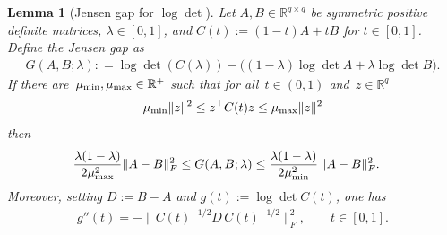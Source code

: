 \documentclass[10pt, letterpaper]{amsart}
\def\bR{\mathbb{R}}
\newtheorem{lem}[theorem]{Lemma}
\def\min{{\rm min}}
\begin{document}
\begin{lem}[Jensen gap for $\log\det$]\label{lem:jensen_gap_logdet}
Let $A,B\in\bR^{q\times q}$ be symmetric positive definite matrices, $\lambda \in [0,1]$, and $C(t):=(1-t)A+tB$ for $t\in[0,1]$.
 Define the Jensen gap as
\begin{align}
    G(A,B;\lambda) : = \log\det\left(C(\lambda)\right)
-\Big((1-\lambda)\log\det A+\lambda\log\det B\Big).
\end{align}
If there are~$\mu_{\min},\mu_{\max}\in\mathbb{R}^+$ such that for all~$t \in (0,1)$ and~$ z \in \mathbb{R}^q$
\begin{align}\label{equ:hypo_jensen_gap}
  \mu_{\min} \|z\|^2 \leq   z^{\top} C(t) z \leq \mu_{\max} \|z\|^2
\end{align}
then
\begin{align}\label{equ:jensen_gap}
\frac{\lambda(1-\lambda)}{2\mu_{\max}^2}  & \|A-B\|_F^2 \le
 G(A,B;\lambda)
 \leq \frac{\lambda(1-\lambda)}{2\mu_{\min}^2}\,\|A-B\|_F^2.
\end{align}
Moreover, setting $D:=B-A$ and $g(t):=\log\det C(t)$, one has
\begin{align}\label{eq:gpp_logdet}
g''(t)=-\bigl\|C(t)^{-1/2}D\,C(t)^{-1/2}\bigr\|_F^2,\qquad t\in[0,1].
\end{align}
\end{lem}
\end{document}
